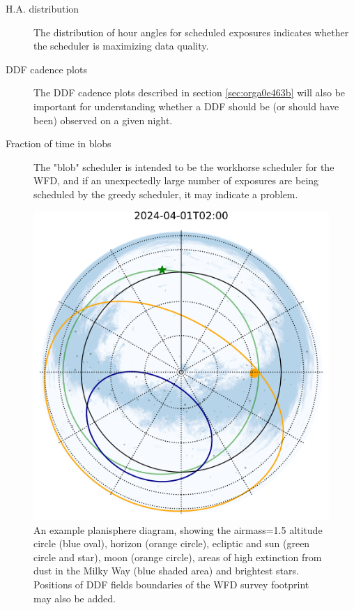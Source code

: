 \begin{description}
\item[{H.A. distribution}] The distribution of hour angles for scheduled exposures indicates whether the scheduler is maximizing data quality.
\item[{DDF cadence plots}] The DDF cadence plots described in section \ref{sec:orga0e463b} will also be important for understanding whether a DDF should be (or should have been) observed on a given night.
\item[{Fraction of time in blobs}] The "blob" scheduler is intended to be the workhorse scheduler for the WFD, and if an unexpectedly large number of exposures are being scheduled by the greedy scheduler, it may indicate a problem.
\end{description}

\begin{figure}[htbp]
\centering
\includegraphics[height=0.4\textheight]{./figures/airmass_map.png}
\caption{\label{fig:org98ba02a}An example planisphere diagram, showing the airmass=1.5 altitude circle (blue oval), horizon (orange circle), ecliptic and sun (green circle and star), moon (orange circle), areas of high extinction from dust in the Milky Way (blue shaded area) and brightest stars. Positions of DDF fields boundaries of the WFD survey footprint may also be added.}
\end{figure}

